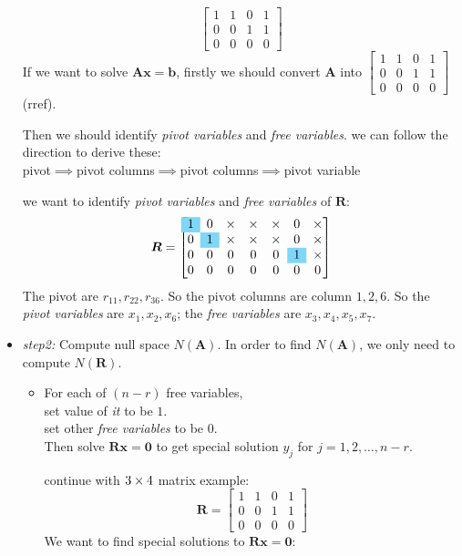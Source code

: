 \begin{itemize}
\begin{example}
\[\begin{bmatrix}
1&1&0&1\\0&0&1&1\\0&0&0&0
\end{bmatrix}\]
If we want to solve $\bm{Ax} = \bm b$, firstly we should convert $\bm A$ into $\begin{bmatrix}
1&1&0&1\\0&0&1&1\\0&0&0&0
\end{bmatrix}$(rref).
\end{example}
Then we should identify \emph{pivot variables} and \emph{free variables}. we can follow the direction to derive these:\\
pivot$\implies$pivot columns$\implies$pivot columns$\implies$pivot variable
\begin{example}
we want to identify \emph{pivot variables} and \emph{free variables} of $\bm R$: 
\[
\bm R = \left[
\begin{array}{@{}ccccccc@{}}
\cellcolor{cyan!50}1&0&\x&\x&\x&0&\x\\
0&\cellcolor{cyan!50}1&\x&\x&\x&0&\x\\
0&0&0&0&0&\cellcolor{cyan!50}1&\x\\
0&0&0&0&0&0&0
\end{array}
\right]
\]
The pivot are $r_{11},r_{22},r_{36}$. So the pivot columns are column $1,2,6$. So the \textit{pivot variables} are $x_1,x_2,x_6$; the \textit{free variables} are $x_3,x_4,x_5,x_7$.
\end{example}
\item
\emph{step2: }Compute null space $N(\bm A)$.
In order to find $N(\bm A)$, we only need to compute $N(\bm R)$.
\begin{itemize}
\item
For each of $(n-r)$ free variables,\\
\hspace*{1cm}set value of \emph{it} to be $1$.\\
\hspace*{1cm}set other \emph{free variables} to be 0.\\
\hspace*{1cm}Then solve $\bm{Rx} = \bm 0$ to get special solution $y_j$ for $j=1,2,\dots,n-r$.
\begin{example}
continue with $3\times 4$ matrix example:
\[
\bm R = \begin{bmatrix}
1&1&0&1\\0&0&1&1\\0&0&0&0
\end{bmatrix}\]
We want to find special solutions to $\bm{Rx} = \bm 0$:

\end{example}
\end{itemize}
\end{itemize}
